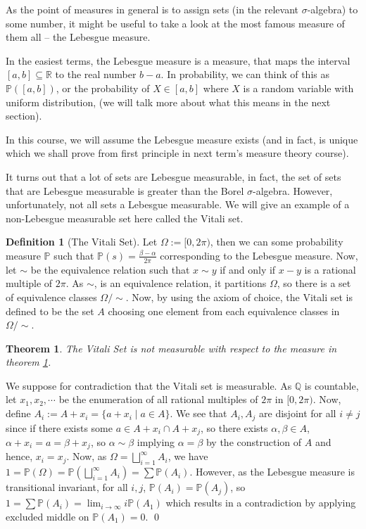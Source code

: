 \documentclass[
]{article}
\newtheorem{theorem}{Theorem}
\theoremstyle{definition}
\newtheorem{definition}{Definition}[section]
\begin{document}
As the point of measures in general is to assign sets (in the relevant
\(\sigma\)-algebra) to some number, it might be useful to take a look at
the most famous measure of them all -- the Lebesgue measure.

In the easiest terms, the Lebesgue measure is a measure, that maps the
interval \([a, b] \subseteq \mathbb{R}\) to the real number \(b - a\).
In probability, we can think of this as \(\mathbb{P}([a, b])\), or the
probability of \(X \in [a, b]\) where \(X\) is a random variable with
uniform distribution, (we will talk more about what this means in the
next section).

In this course, we will assume the Lebesgue measure exists (and in fact,
is unique which we shall prove from first principle in next term's
measure theory course).

It turns out that a lot of sets are Lebesgue measurable, in fact, the
set of sets that are Lebesgue measurable is greater than the Borel
\(\sigma\)-algebra. However, unfortunately, not all sets a Lebesgue
measurable. We will give an example of a non-Lebesgue measurable set
here called the Vitali set.

\begin{definition}[The Vitali Set]\label{vitali}
  Let \(\Omega := [0, 2\pi)\), then we can some probability measure \(\mathbb{P}\) 
  such that \(\mathbb{P}(s) = \frac{\beta - \alpha}{2\pi}\) corresponding to 
  the Lebesgue measure. Now, let \(\sim\) be the equivalence relation such that 
  \(x \sim y\) if and only if \(x - y\) is a rational multiple of \(2\pi\). 
  As \(\sim\), 
  is an equivalence relation, it partitions \(\Omega\), so there is a set of 
  equivalence classes \(\Omega / \sim\). Now, by using the axiom of choice,
  the Vitali set is defined to be the set \(A\) choosing one element from 
  each equivalence classes in \(\Omega / \sim\).
\end{definition}

\begin{theorem}
  The Vitali Set is not measurable with respect to the measure in 
  theorem \ref{vitali}.
\end{theorem}
\proof

We suppose for contradiction that the Vitali set is measurable. As
\(\mathbb{Q}\) is countable, let \(x_1, x_2, \cdots\) be the enumeration
of all rational multiples of \(2\pi\) in \([0, 2\pi)\). Now, define
\(A_i := A + x_i = \{a + x_i \mid a \in A\}\). We see that \(A_i, A_j\)
are disjoint for all \(i \neq j\) since if there exists some
\(a \in A + x_i \cap A + x_j\), so there exists \(\alpha, \beta \in A\),
\(\alpha + x_i = a = \beta + x_j\), so \(\alpha \sim \beta\) implying
\(\alpha = \beta\) by the construction of \(A\) and hence,
\(x_i = x_j\). Now, as \(\Omega = \bigsqcup_{i = 1}^\infty A_i\), we
have
\(1  = \mathbb{P}(\Omega) = \mathbb{P}(\bigsqcup_{i = 1}^\infty A_i)  = \sum \mathbb{P}(A_i)\).
However, as the Lebesgue measure is transitional invariant, for all
\(i, j\), \(\mathbb{P}(A_i) = \mathbb{P}(A_j)\), so
\(1 = \sum \mathbb{P}(A_i) = \lim_{i \to \infty} i \mathbb{P}(A_1)\)
which results in a contradiction by applying excluded middle on
\(\mathbb{P}(A_1) = 0\). \qed
\end{document}
